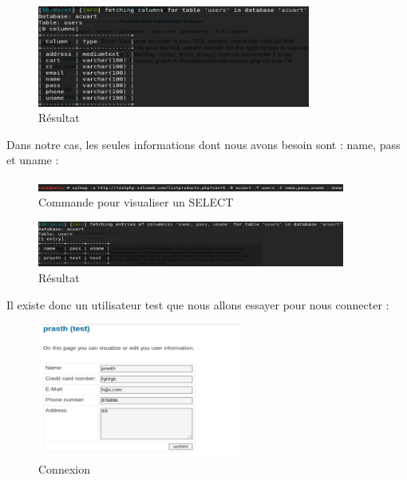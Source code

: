 \begin{figure}[htp!]
  \centering
  \setlength\figureheight{7cm}
  \setlength\figurewidth{9cm}
  \includegraphics[width=0.8\textwidth]{oui/Ancien/imangeancien/SQLi/7.PNG}
  \caption{Résultat}
  \label{fig:courbe-tikz}
\end{figure}

Dans notre cas, les seules informations dont nous avons besoin sont : name, pass et uname :

\begin{figure}[htp!]
  \centering
  \setlength\figureheight{7cm}
  \setlength\figurewidth{9cm}
  \includegraphics[width=0.9\textwidth]{oui/Ancien/imangeancien/SQLi/8.PNG}
  \caption{Commande pour visualiser un SELECT}
  \label{fig:courbe-tikz}
\end{figure}

\begin{figure}[htp!]
  \centering
  \setlength\figureheight{7cm}
  \setlength\figurewidth{9cm}
  \includegraphics[width=0.9\textwidth]{oui/Ancien/imangeancien/SQLi/9.PNG}
  \caption{Résultat}
  \label{fig:courbe-tikz}
\end{figure}

\vspace{4cm}

Il existe donc un utilisateur test que nous allons essayer pour nous connecter :

\begin{figure}[htp!]
  \centering
  \setlength\figureheight{7cm}
  \setlength\figurewidth{9cm}
  \includegraphics[width=0.6\textwidth]{oui/Ancien/imangeancien/SQLi/11.PNG}
  \caption{Connexion}
  \label{fig:courbe-tikz}
\end{figure}

